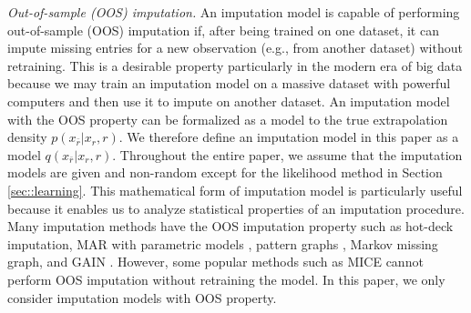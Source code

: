 \documentclass[aos, preprint]{imsart}
\theoremstyle{plain}
\theoremstyle{definition}
\begin{document}
\emph{Out-of-sample (OOS) imputation.}
An imputation model is capable of performing out-of-sample (OOS) imputation if, after being trained on one dataset, 
it can impute missing entries for a new observation (e.g., from another dataset) without retraining.
This is a desirable property particularly in the modern era of big data
because we may train an imputation model on a massive dataset with powerful computers and then
use it to impute on another dataset.
An imputation model with the OOS property can be formalized as a model to the true extrapolation density $p(x_{\bar r}|x_r,r)$. 
We therefore define an imputation model in this paper as a model
$q(x_{\bar r}|x_r,r)$. 
Throughout the entire paper, we assume that the imputation models are given and non-random except for 
the likelihood method in Section \ref{sec::learning}.
This mathematical form of imputation model is particularly useful
because it enables us to analyze statistical properties of an imputation procedure.
Many imputation methods have the OOS imputation property such as hot-deck imputation, MAR with parametric models \citep{little2019statistical}, 
pattern graphs \citep{chen2022pattern},  Markov missing graph,
and GAIN \citep{yoon2018gain}.
However, 
some popular methods such as MICE \citep{van2011mice} 
cannot perform OOS imputation without retraining the model.
In this paper, we only consider imputation models with OOS property.







\end{document}
